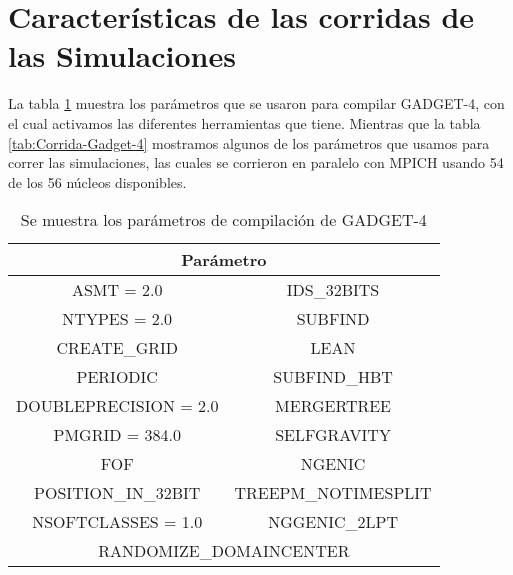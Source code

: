 \section{Características de las corridas de las Simulaciones}

La tabla \ref{tab:Comp-Gadget-4} muestra los parámetros que se usaron para compilar GADGET-4, con el cual activamos las diferentes herramientas que tiene. Mientras que la tabla \ref{tab:Corrida-Gadget-4} mostramos algunos de los parámetros que usamos para correr las simulaciones, las cuales se corrieron en paralelo con MPICH usando 54 de los 56 núcleos disponibles.

\begin{table}[H]

    \centering

    \begin{tabular}{|c|c|}
    	
        \hline
        \multicolumn{2}{|c|}{\textbf{Parámetro}} \\ \hline
        ASMT = 2.0 & IDS\_32BITS \\ \hline
        NTYPES = 2.0 & SUBFIND \\ \hline
        CREATE\_GRID & LEAN \\ \hline
        PERIODIC & SUBFIND\_HBT \\ \hline
        DOUBLEPRECISION = 2.0 & MERGERTREE \\ \hline 
        PMGRID = 384.0 & SELFGRAVITY \\ \hline
        FOF & NGENIC \\ \hline
        POSITION\_IN\_32BIT & TREEPM\_NOTIMESPLIT \\ \hline
        NSOFTCLASSES = 1.0 & NGGENIC\_2LPT \\ \hline
        \multicolumn{2}{|c|}{RANDOMIZE\_DOMAINCENTER }  \\ \hline
    	
    \end{tabular}

    \caption{Se muestra los parámetros de compilación de GADGET-4}

    \label{tab:Comp-Gadget-4}

\end{table}

